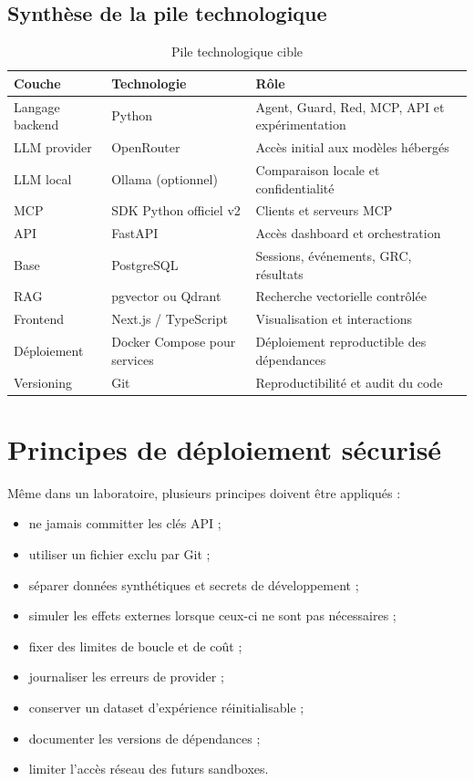 \subsection{Synthèse de la pile technologique}

\begin{table}[H]
\centering
\caption{Pile technologique cible}
\label{tab:stack}
\begin{tabularx}{\textwidth}{p{3.2cm} p{4cm} X}
\toprule
\textbf{Couche} & \textbf{Technologie} & \textbf{Rôle} \\
\midrule
Langage backend & Python & Agent, Guard, Red, MCP, API et expérimentation \\
LLM provider & OpenRouter & Accès initial aux modèles hébergés \\
LLM local & Ollama (optionnel) & Comparaison locale et confidentialité \\
MCP & SDK Python officiel v2 & Clients et serveurs MCP \\
API & FastAPI & Accès dashboard et orchestration \\
Base & PostgreSQL & Sessions, événements, GRC, résultats \\
RAG & pgvector ou Qdrant & Recherche vectorielle contrôlée \\
Frontend & Next.js / TypeScript & Visualisation et interactions \\
Déploiement & Docker Compose pour services & Déploiement reproductible des dépendances \\
Versioning & Git & Reproductibilité et audit du code \\
\bottomrule
\end{tabularx}
\end{table}

\section{Principes de déploiement sécurisé}

Même dans un laboratoire, plusieurs principes doivent être appliqués :

\begin{itemize}
    \item ne jamais committer les clés API ;
    \item utiliser un fichier  exclu par Git ;
    \item séparer données synthétiques et secrets de développement ;
    \item simuler les effets externes lorsque ceux-ci ne sont pas nécessaires ;
    \item fixer des limites de boucle et de coût ;
    \item journaliser les erreurs de provider ;
    \item conserver un dataset d'expérience réinitialisable ;
    \item documenter les versions de dépendances ;
    \item limiter l'accès réseau des futurs sandboxes.
\end{itemize}

